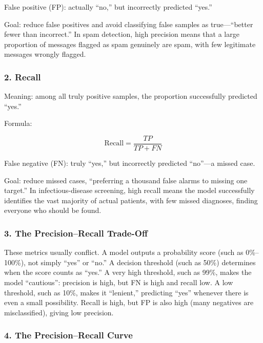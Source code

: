 False positive (FP): actually ``no,'' but incorrectly predicted ``yes.''

Goal: reduce false positives and avoid classifying false samples as true---``better fewer than incorrect.'' In spam detection, high precision means that a large proportion of messages flagged as spam genuinely are spam, with few legitimate messages wrongly flagged.

\hypertarget{recall}{%
\subsubsection{2. Recall}\label{recall}}

Meaning: among all truly positive samples, the proportion successfully predicted ``yes.''

Formula:

\[
\mathrm{Recall}=\frac{TP}{TP+FN}
\]

False negative (FN): truly ``yes,'' but incorrectly predicted ``no''---a missed case.

Goal: reduce missed cases, ``preferring a thousand false alarms to missing one target.'' In infectious-disease screening, high recall means the model successfully identifies the vast majority of actual patients, with few missed diagnoses, finding everyone who should be found.

\hypertarget{the-precisionrecall-trade-off}{%
\subsubsection{3. The Precision--Recall Trade-Off}\label{the-precisionrecall-trade-off}}

These metrics usually conflict. A model outputs a probability score (such as 0\%--100\%), not simply ``yes'' or ``no.'' A decision threshold (such as 50\%) determines when the score counts as ``yes.'' A very high threshold, such as 99\%, makes the model ``cautious'': precision is high, but FN is high and recall low. A low threshold, such as 10\%, makes it ``lenient,'' predicting ``yes'' whenever there is even a small possibility. Recall is high, but FP is also high (many negatives are misclassified), giving low precision.

\hypertarget{the-precisionrecall-curve}{%
\subsubsection{4. The Precision--Recall Curve}\label{the-precisionrecall-curve}}

